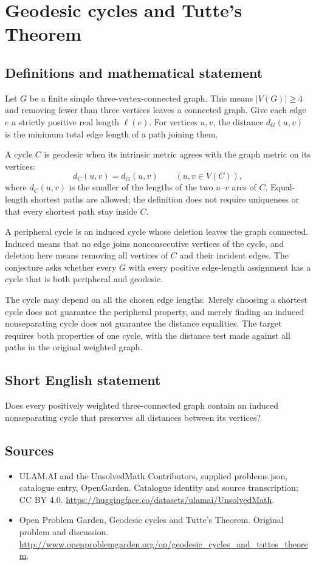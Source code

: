\documentclass[11pt,a4paper]{article}
\begin{document}
\section*{Geodesic cycles and Tutte's Theorem}\label{statement}

\subsection{Definitions and mathematical statement}
Let $G$ be a finite simple three-vertex-connected graph. This means $|V(G)|\ge4$ and removing fewer than three vertices leaves a connected graph. Give each edge $e$ a strictly positive real length $\ell(e)$. For vertices $u,v$, the distance $d_G(u,v)$ is the minimum total edge length of a path joining them.

A cycle $C$ is geodesic when its intrinsic metric agrees with the graph metric on its vertices:
\[
       d_C(u,v)=d_G(u,v)\qquad(u,v\in V(C)),
\]
where $d_C(u,v)$ is the smaller of the lengths of the two $u$--$v$ arcs of $C$. Equal-length shortest paths are allowed; the definition does not require uniqueness or that every shortest path stay inside $C$.

A peripheral cycle is an induced cycle whose deletion leaves the graph connected. Induced means that no edge joins nonconsecutive vertices of the cycle, and deletion here means removing all vertices of $C$ and their incident edges. The conjecture asks whether every $G$ with every positive edge-length assignment has a cycle that is both peripheral and geodesic.

The cycle may depend on all the chosen edge lengths. Merely choosing a shortest cycle does not guarantee the peripheral property, and merely finding an induced nonseparating cycle does not guarantee the distance equalities. The target requires both properties of one cycle, with the distance test made against all paths in the original weighted graph.
\subsection{Short English statement}
Does every positively weighted three-connected graph contain an induced nonseparating cycle that preserves all distances between its vertices?
\subsection{Sources}
\begin{itemize}
\item[S1] ULAM.AI and the UnsolvedMath Contributors, supplied problems.json, catalogue entry, OpenGarden. Catalogue identity and source transcription; CC BY 4.0.
\url{https://huggingface.co/datasets/ulamai/UnsolvedMath}.
\item[S2] Open Problem Garden, Geodesic cycles and Tutte's Theorem. Original problem and discussion.
\url{http://www.openproblemgarden.org/op/geodesic_cycles_and_tuttes_theorem}.
\end{itemize}
\end{document}
